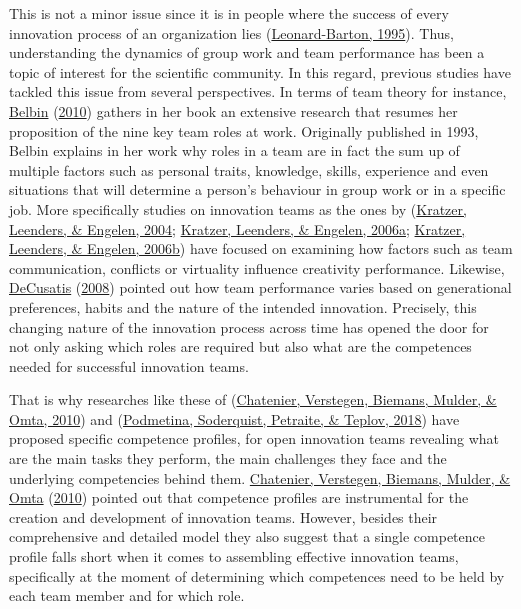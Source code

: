 \documentclass[]{elsarticle} %
\begin{document}
This is not a minor issue since it is in people where the success of
every innovation process of an organization lies
(\protect\hyperlink{ref-Leonard1995}{Leonard-Barton, 1995}). Thus,
understanding the dynamics of group work and team performance has been a
topic of interest for the scientific community. In this regard, previous
studies have tackled this issue from several perspectives. In terms of
team theory for instance, \protect\hyperlink{ref-Belbin2010}{Belbin}
(\protect\hyperlink{ref-Belbin2010}{2010}) gathers in her book an
extensive research that resumes her proposition of the nine key team
roles at work. Originally published in 1993, Belbin explains in her work
why roles in a team are in fact the sum up of multiple factors such as
personal traits, knowledge, skills, experience and even situations that
will determine a person's behaviour in group work or in a specific job.
More specifically studies on innovation teams as the ones by
(\protect\hyperlink{ref-Kratzer2004}{Kratzer, Leenders, \& Engelen,
2004}; \protect\hyperlink{ref-Kratzer2006-A}{Kratzer, Leenders, \&
Engelen, 2006a}; \protect\hyperlink{ref-Kratzer2006-B}{Kratzer,
Leenders, \& Engelen, 2006b}) have focused on examining how factors such
as team communication, conflicts or virtuality influence creativity
performance. Likewise, \protect\hyperlink{ref-DeCusatis2008}{DeCusatis}
(\protect\hyperlink{ref-DeCusatis2008}{2008}) pointed out how team
performance varies based on generational preferences, habits and the
nature of the intended innovation. Precisely, this changing nature of
the innovation process across time has opened the door for not only
asking which roles are required but also what are the competences needed
for successful innovation teams.

That is why researches like these of
(\protect\hyperlink{ref-Chatenier2010}{Chatenier, Verstegen, Biemans,
Mulder, \& Omta, 2010}) and
(\protect\hyperlink{ref-Podmetina2018}{Podmetina, Soderquist, Petraite,
\& Teplov, 2018}) have proposed specific competence profiles, for open
innovation teams revealing what are the main tasks they perform, the
main challenges they face and the underlying competencies behind them.
\protect\hyperlink{ref-Chatenier2010}{Chatenier, Verstegen, Biemans,
Mulder, \& Omta} (\protect\hyperlink{ref-Chatenier2010}{2010}) pointed
out that competence profiles are instrumental for the creation and
development of innovation teams. However, besides their comprehensive
and detailed model they also suggest that a single competence profile
falls short when it comes to assembling effective innovation teams,
specifically at the moment of determining which competences need to be
held by each team member and for which role.
\end{document}
